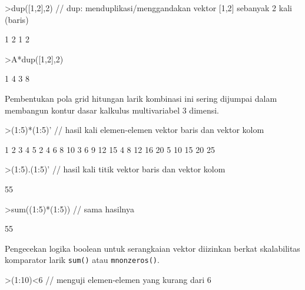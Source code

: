 \documentclass[a4paper,11pt,oneside,enabledeprecatedfontcommands]{scrbook}
\newenvironment{eulernotebook}{}{}
\newenvironment{eulercomment}{\par\medskip\noindent}{\par\medskip}
\begin{document}
\begin{eulernotebook}
\begin{eulerprompt}
>dup([1,2],2) // dup: menduplikasi/menggandakan vektor [1,2] sebanyak 2 kali (baris)
\end{eulerprompt}
\begin{euleroutput}
            1             2 
            1             2 
\end{euleroutput}
\begin{eulerprompt}
>A*dup([1,2],2) 
\end{eulerprompt}
\begin{euleroutput}
            1             4 
            3             8 
\end{euleroutput}
\begin{eulercomment}
Pembentukan pola grid hitungan larik kombinasi ini sering dijumpai dalam membangun kontur dasar kalkulus multivariabel 3 dimensi.
\end{eulercomment}
\begin{eulerprompt}
>(1:5)*(1:5)' // hasil kali elemen-elemen vektor baris dan vektor kolom
\end{eulerprompt}
\begin{euleroutput}
            1             2             3             4             5 
            2             4             6             8            10 
            3             6             9            12            15 
            4             8            12            16            20 
            5            10            15            20            25 
\end{euleroutput}
\begin{eulerprompt}
>(1:5).(1:5)' // hasil kali titik vektor baris dan vektor kolom
\end{eulerprompt}
\begin{euleroutput}
55
\end{euleroutput}
\begin{eulerprompt}
>sum((1:5)*(1:5)) // sama hasilnya
\end{eulerprompt}
\begin{euleroutput}
55
\end{euleroutput}
\begin{eulercomment}
Pengecekan logika boolean untuk serangkaian vektor diizinkan berkat skalabilitas komparator larik \texttt{sum()} atau \texttt{mnonzeros()}.
\end{eulercomment}
\begin{eulerprompt}
>(1:10)<6 // menguji elemen-elemen yang kurang dari 6
\end{eulerprompt}

\end{eulernotebook}
\end{document}
